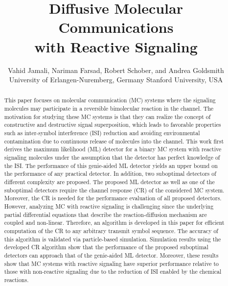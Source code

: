 \documentclass[conference]{IEEEtran}
\begin{document}

\title{Diffusive Molecular Communications \\   with Reactive Signaling}

\author{
Vahid Jamali\dag, Nariman Farsad\ddag, Robert Schober\dag, and Andrea Goldsmith\ddag  \\
\dag University of Erlangen-Nuremberg, Germany
\quad
\ddag Stanford University,  USA\vspace{-0.3cm}
}



\maketitle


\begin{abstract}
This paper focuses on molecular communication (MC) systems  where the signaling molecules may participate in a reversible bimolecular reaction in the channel. The motivation for studying these MC systems is that they can realize the concept of constructive and destructive signal superposition, which leads to  favorable properties such as inter-symbol interference (ISI) reduction and avoiding environmental contamination due to continuous release of molecules into the channel.  This work first derives the maximum likelihood (ML) detector for a binary MC system with reactive signaling molecules under the assumption that the detector has perfect knowledge of the ISI. The performance of this genie-aided ML detector yields an upper bound on the performance of any practical detector. In addition, two suboptimal detectors of different complexity are proposed. The proposed ML detector as well as one of the suboptimal detectors require the channel response (CR) of the considered MC system. Moreover, the CR is needed for the performance evaluation of all proposed detectors.  However, analyzing  MC with reactive signaling is challenging since the underlying partial differential equations that describe the reaction-diffusion mechanism are coupled and non-linear. Therefore,  an algorithm is developed in this paper for efficient computation of the CR to any arbitrary transmit symbol sequence. The accuracy of this algorithm is validated via particle-based simulation.   Simulation results using the developed CR algorithm show that the performance of the proposed suboptimal detectors can approach that of the genie-aided ML detector. Moreover, these results show that MC systems  with reactive signaling have superior performance relative to those with non-reactive signaling due to the reduction of ISI enabled by the chemical reactions.
\end{abstract}
\end{document}
